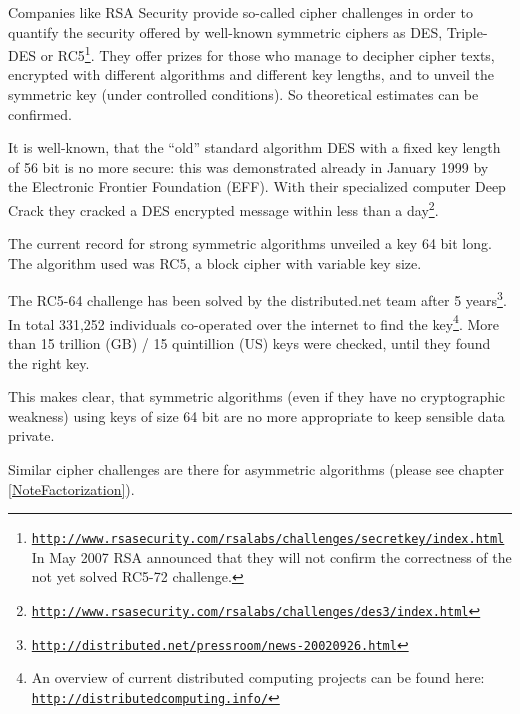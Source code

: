 Companies like RSA Security provide so-called cipher challenges in order to quantify the security offered by well-known symmetric ciphers as DES, Triple-DES or RC5\footnote{\href{http://www.rsasecurity.com/rsalabs/challenges/secretkey/index.html}{\tt http://www.rsasecurity.com/rsalabs/challenges/secretkey/index.html}\\
In May 2007 RSA announced that they will not confirm the correctness of the not yet solved RC5-72 challenge.}. They offer prizes for those who manage to decipher cipher texts, encrypted with different algorithms and different key lengths, and to unveil the symmetric key (under controlled conditions). So theoretical estimates can be confirmed.

It is well-known, that the ``old'' standard algorithm DES with a fixed key length of 56 bit is no more secure: this was demonstrated already in January 1999 by the Electronic Frontier Foundation (EFF). With their specialized computer Deep Crack they cracked a DES encrypted message within less than a day\footnote{\href{http://www.rsasecurity.com/rsalabs/challenges/des3/index.html}{\tt http://www.rsasecurity.com/rsalabs/challenges/des3/index.html}}.

The current record for strong symmetric algorithms unveiled a key 64 bit long. The algorithm used was RC5, a block cipher with variable key size. 

The RC5-64 challenge has been solved by the distributed.net team after 5 years\footnote{\href{http://distributed.net/pressroom/news-20020926.html}{\tt http://distributed.net/pressroom/news-20020926.html}}.  In total 331,252 individuals co-operated over the internet to find the key\footnote{%
An overview of current distributed computing projects can be found here:\\
\href{http://distributedcomputing.info/}{\tt http://distributedcomputing.info/}
}. More than 15 trillion (GB) / 15 quintillion (US)  keys were checked, until they found the right key.

This makes clear, that symmetric algorithms (even if they have no cryptographic weakness) using keys of size 64 bit are no more appropriate to keep sensible data private.

Similar cipher challenges are there for asymmetric algorithms (please see chapter \ref{NoteFactorization}).





